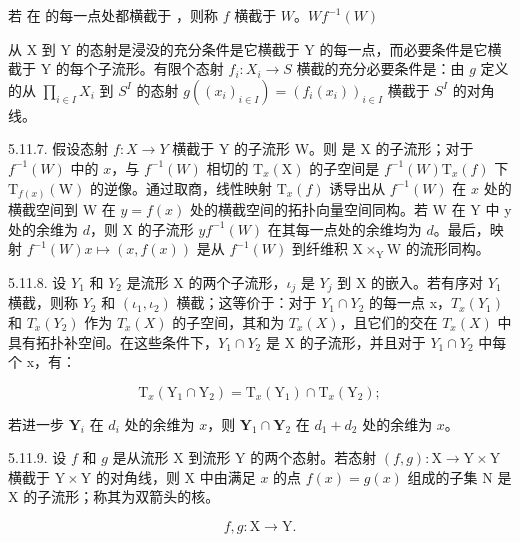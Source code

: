 若  在  的每一点处都横截于 ，则称 \(f\) 横截于 \(W\)。\(W\)\(f^{-1}(W)\)

从 X 到 Y 的态射是浸没的充分条件是它横截于 Y 的每一点，而必要条件是它横截于 Y 的每个子流形。有限个态射 \(f_{i}:X_{i}\to S\) 横截的充分必要条件是：由 \(g\) 定义的从 \(\prod_{i\in I}X_{i}\) 到 \(S^{I}\) 的态射 \(g((x_{i})_{i\in I})=(f_{i}(x_{i}))_{i\in I}\) 横截于 \(S^{I}\) 的对角线。

5.11.7. 假设态射 \(f:X\to Y\) 横截于 Y 的子流形 W。则  是 X 的子流形；对于 \(f^{-1}(W)\) 中的 \(x\)，与 \(f^{-1}(W)\) 相切的 \(\mathrm{T}_{x}(\mathrm{X})\) 的子空间是 \(f^{-1}(W)\)\(\mathrm{T}_{x}(f)\) 下 \(\mathrm{T}_{f(x)}(\mathrm{W})\) 的逆像。通过取商，线性映射 \(\mathrm{T}_{x}(f)\) 诱导出从 \(f^{-1}(W)\) 在 \(x\) 处的横截空间到 W 在 \(y=f(x)\) 处的横截空间的拓扑向量空间同构。若 W 在 Y 中 y 处的余维为 \(d\)，则 X 的子流形 \(y\)\(f^{-1}(W)\) 在其每一点处的余维均为 \(d\)。最后，映射 \(f^{-1}(W)\)\(x\mapsto(x,f(x))\) 是从 \(f^{-1}(W)\) 到纤维积 \(\mathrm{X}\times_{\mathrm{Y}}\mathrm{W}\) 的流形同构。

5.11.8. 设 \(Y_{1}\) 和 \(Y_{2}\) 是流形 X 的两个子流形，\(\iota_{j}\) 是 \(Y_{j}\) 到 X 的嵌入。若有序对 \(Y_{1}\) 横截，则称 \(Y_{2}\) 和 \((\iota_{1},\iota_{2})\) 横截；这等价于：对于 \(Y_{1}\cap Y_{2}\) 的每一点 x，\(T_{x}(Y_{1})\) 和 \(T_{x}(Y_{2})\) 作为 \(T_{x}(X)\) 的子空间，其和为 \(T_{x}(X)\)，且它们的交在 \(T_{x}(X)\) 中具有拓扑补空间。在这些条件下，\(Y_{1}\cap Y_{2}\) 是 X 的子流形，并且对于 \(Y_{1}\cap Y_{2}\) 中每个 x，有：

\[
\mathrm{T} _ {x} (\mathrm{Y} _ {1} \cap \mathrm{Y} _ {2}) = \mathrm{T} _ {x} (\mathrm{Y} _ {1}) \cap \mathrm{T} _ {x} (\mathrm{Y} _ {2});
\]

若进一步 \(\mathbf{Y}_i\) 在 \(d_i\) 处的余维为 \(x\)，则 \(\mathbf{Y}_1 \cap \mathbf{Y}_2\) 在 \(d_1 + d_2\) 处的余维为 \(x\)。

5.11.9. 设 \(f\) 和 \(g\) 是从流形 X 到流形 Y 的两个态射。若态射 \((f,g):\mathrm{X}\to\mathrm{Y}\times\mathrm{Y}\) 横截于 \(\mathrm{Y}\times\mathrm{Y}\) 的对角线，则 X 中由满足 \(x\) 的点 \(f(x)=g(x)\) 组成的子集 N 是 X 的子流形；称其为双箭头的核。

\[
f, g: \mathrm{X} \longrightarrow \mathrm{Y}.
\]

